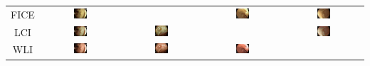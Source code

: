 \documentclass[12pt]{extreport}
\begin{document}
\begin{table}[H]
\begin{tabular}{c | c | c | c | c}
        FICE & \includegraphics[width=0.18\textwidth]{transform/BLI2FICE.jpeg}     &                                                                      & \includegraphics[width=0.18\textwidth]{transform/LCI2FICE.jpeg}     & \includegraphics[width=0.18\textwidth]{transform/WLI2FICE.jpeg}     \\
        LCI  & \includegraphics[width=0.18\textwidth]{transform/BLI2LCI.jpeg}      & \includegraphics[width=0.18\textwidth]{transform/FICE2LCI.jpeg}      &                                                                     & \includegraphics[width=0.18\textwidth]{transform/WLI2LCI.jpeg}      \\
        WLI  & \includegraphics[width=0.18\textwidth]{transform/BLI2WLI.jpeg}      & \includegraphics[width=0.18\textwidth]{transform/FICE2WLI.jpeg}      & \includegraphics[width=0.18\textwidth]{transform/LCI2WLI.jpeg}      &                                                                     \\

\end{tabular}
\end{table}
\end{document}
